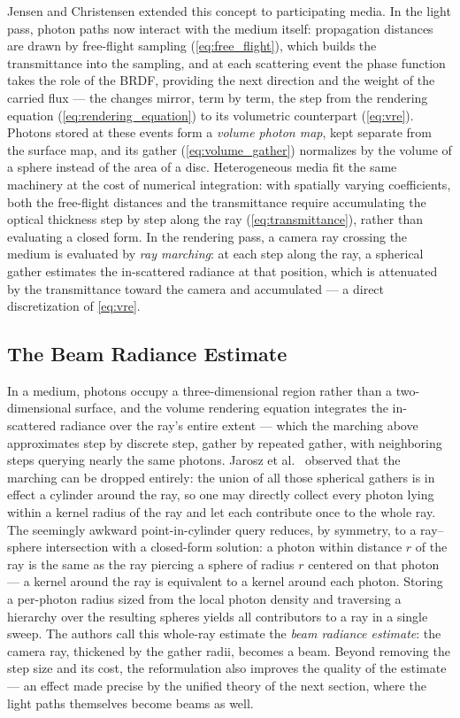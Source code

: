 Jensen and Christensen \cite{jensen98} extended this concept to participating media. In the light pass, photon paths now interact with the medium itself: propagation distances are drawn by free-flight sampling (\cref{eq:free_flight}), which builds the transmittance into the sampling, and at each scattering event the phase function takes the role of the BRDF, providing the next direction and the weight of the carried flux --- the changes mirror, term by term, the step from the rendering equation (\cref{eq:rendering_equation}) to its volumetric counterpart (\cref{eq:vre}). Photons stored at these events form a \emph{volume photon map}, kept separate from the surface map, and its gather (\cref{eq:volume_gather}) normalizes by the volume of a sphere instead of the area of a disc. Heterogeneous media fit the same machinery at the cost of numerical integration: with spatially varying coefficients, both the free-flight distances and the transmittance require accumulating the optical thickness step by step along the ray (\cref{eq:transmittance}), rather than evaluating a closed form. In the rendering pass, a camera ray crossing the medium is evaluated by \emph{ray marching}: at each step along the ray, a spherical gather estimates the in-scattered radiance at that position, which is attenuated by the transmittance toward the camera and accumulated --- a direct discretization of \cref{eq:vre}.

\subsection{The Beam Radiance Estimate}

In a medium, photons occupy a three-dimensional region rather than a two-dimensional surface, and the volume rendering equation integrates the in-scattered radiance over the ray's entire extent --- which the marching above approximates step by discrete step, gather by repeated gather, with neighboring steps querying nearly the same photons. Jarosz et al.\ \cite{jarosz08beam-tech} observed that the marching can be dropped entirely: the union of all those spherical gathers is in effect a cylinder around the ray, so one may directly collect every photon lying within a kernel radius of the ray and let each contribute once to the whole ray. The seemingly awkward point-in-cylinder query reduces, by symmetry, to a ray--sphere intersection with a closed-form solution: a photon within distance $r$ of the ray is the same as the ray piercing a sphere of radius $r$ centered on that photon --- a kernel around the ray is equivalent to a kernel around each photon. Storing a per-photon radius sized from the local photon density and traversing a hierarchy over the resulting spheres yields all contributors to a ray in a single sweep. The authors call this whole-ray estimate the \emph{beam radiance estimate}: the camera ray, thickened by the gather radii, becomes a beam. Beyond removing the step size and its cost, the reformulation also improves the quality of the estimate --- an effect made precise by the unified theory of the next section, where the light paths themselves become beams as well.

